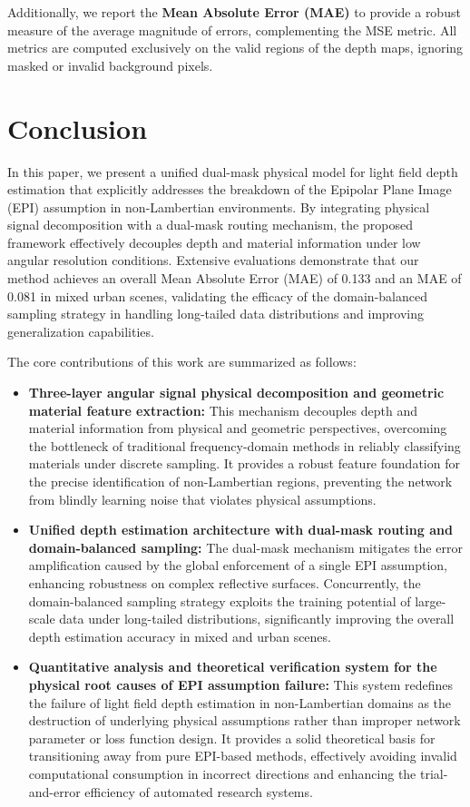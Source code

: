 \documentclass[lettersize,journal]{IEEEtran}
\begin{document}
Additionally, we report the \textbf{Mean Absolute Error (MAE)} to provide a robust measure of the average magnitude of errors, complementing the MSE metric. All metrics are computed exclusively on the valid regions of the depth maps, ignoring masked or invalid background pixels.

\section{Conclusion}

In this paper, we present a unified dual-mask physical model for light field depth estimation that explicitly addresses the breakdown of the Epipolar Plane Image (EPI) assumption in non-Lambertian environments. By integrating physical signal decomposition with a dual-mask routing mechanism, the proposed framework effectively decouples depth and material information under low angular resolution conditions. Extensive evaluations demonstrate that our method achieves an overall Mean Absolute Error (MAE) of 0.133 and an MAE of 0.081 in mixed urban scenes, validating the efficacy of the domain-balanced sampling strategy in handling long-tailed data distributions and improving generalization capabilities.

The core contributions of this work are summarized as follows:
\begin{itemize}
\item \textbf{Three-layer angular signal physical decomposition and geometric material feature extraction:} This mechanism decouples depth and material information from physical and geometric perspectives, overcoming the bottleneck of traditional frequency-domain methods in reliably classifying materials under discrete sampling. It provides a robust feature foundation for the precise identification of non-Lambertian regions, preventing the network from blindly learning noise that violates physical assumptions.
\item \textbf{Unified depth estimation architecture with dual-mask routing and domain-balanced sampling:} The dual-mask mechanism mitigates the error amplification caused by the global enforcement of a single EPI assumption, enhancing robustness on complex reflective surfaces. Concurrently, the domain-balanced sampling strategy exploits the training potential of large-scale data under long-tailed distributions, significantly improving the overall depth estimation accuracy in mixed and urban scenes.
\item \textbf{Quantitative analysis and theoretical verification system for the physical root causes of EPI assumption failure:} This system redefines the failure of light field depth estimation in non-Lambertian domains as the destruction of underlying physical assumptions rather than improper network parameter or loss function design. It provides a solid theoretical basis for transitioning away from pure EPI-based methods, effectively avoiding invalid computational consumption in incorrect directions and enhancing the trial-and-error efficiency of automated research systems.
\end{itemize}
\end{document}
